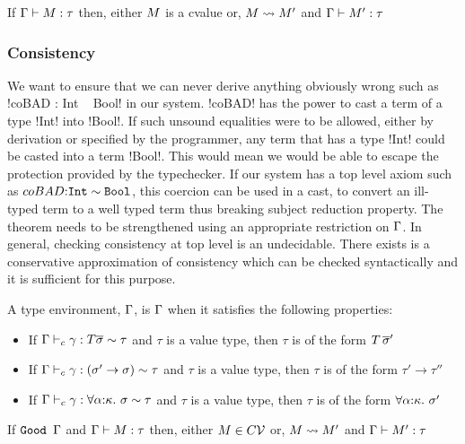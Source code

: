 \documentclass[screen,nonacm]{acmart}
\begin{document}
\begin{prop}\label{prop:sfc-ty-safety}
 If $\Gamma \vdash M : \tau$ then, either $M$ is a cvalue or, $M \rightsquigarrow M'$ and
 $\Gamma \vdash M' : \tau$
\end{prop}

\subsubsection{Consistency}
We want to ensure that we can never derive anything obviously
wrong such as !coBAD : Int ~ Bool! in our system.
!coBAD! has the power to cast a term of a type !Int! into !Bool!. If
such unsound equalities were to be allowed, either by derivation or
specified by the programmer, any term that has a type !Int! could be
casted into a term !Bool!. This would mean we would be able to escape
the protection provided by the typechecker. If our system has a top
level axiom such as $coBAD {:} \texttt{Int} \sim \texttt{Bool}$, this
coercion can be used in a cast, to convert an ill-typed term to a well
typed term thus breaking subject reduction property. The theorem needs
to be strengthened using an appropriate restriction on $\TEnv$. In
general, checking consistency at top level is an undecidable. There
exists is a conservative approximation of consistency which can be
checked syntactically and it is sufficient for this purpose.


\begin{definition}[\Good $\TEnv$]
 A type environment, $\TEnv$, is \Good $\TEnv$ when it satisfies the following properties:
 \begin{itemize}
 \item If $\Gamma \vdash_{c} \gamma : T \overline{\sigma} \sim \tau$ and $\tau$ is a value type, then $\tau$ is of the form $T\,\overline{\sigma}'$
 \item If $\Gamma \vdash_{c} \gamma : (\sigma' \to \sigma) \sim \tau$ and $\tau$ is a value type, then $\tau$ is of the form $\tau' \to \tau''$
 \item If $\Gamma \vdash_{c} \gamma : \forall\alpha{:}\kappa.~\sigma \sim \tau$ and $\tau$ is a value type, then $\tau$ is of the form $\forall\alpha{:}\kappa.~\sigma'$
 \end{itemize}
\end{definition}

\begin{theorem}\label{thm:progress-sfc}
 If $\texttt{Good~}\Gamma$ and $\Gamma \vdash M : \tau$ then, either $M \in C\mathcal{V}$ or, $M \rightsquigarrow M'$ and
 $\Gamma \vdash M' : \tau$
\end{theorem}
\end{document}
